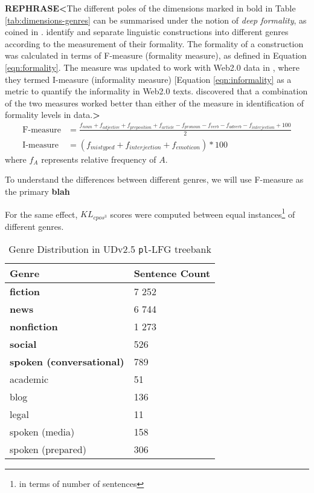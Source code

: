 \textbf{REPHRASE<}The different poles of the dimensions marked in bold in Table \ref{tab:dimensions-genres} can be summarised under the notion of \textit{deep formality}, as coined in \cite{formality1}. \citeauthor{formality1} identify and separate linguistic constructions into different genres according to the measurement of their formality. The formality of a construction was calculated in terms of F-measure (formality measure), as defined in Equation \ref{eqn:formality}. The measure was updated to work with Web2.0 data in \cite{formality2}, where they termed I-measure (informality measure) [Equation \ref{eqn:informality} as a metric to quantify the informality in Web2.0 texts. \citeauthor{formality2} discovered that a combination of the two measures worked better than either of the measure in identification of formality levels in data.\textbf{>}
\begin{align}
    \text{F-measure} &= \textstyle{\frac{f_{noun} + f_{adjective} + f_{preposition} + f_{article} - f_{pronoun} - f_{verb} - f_{adverb} - f_{interjection} + 100}{2}} \label{eqn:formality}\\
    \text{I-measure} &= (f_{mistyped} + f_{interjection} + f_{emoticon}) * 100 \label{eqn:informality}
\end{align}
where \(f_{A}\) represents relative frequency of \(A\).

To understand the differences between different genres, we will use F-measure as the primary 
\textbf{blah}
 


For the same effect, \(KL_{cpos^{3}}\) scores were computed between equal instances\footnote{in terms of number of sentences} of different genres. 

\begin{table}[h]
    \centering
    \begin{tabular}{|l|l|}
        \hline
        \textbf{Genre} & \textbf{Sentence Count} \\
        \hline
        \hline
        \textbf{fiction} & 7 252 \\
        \textbf{news} & 6 744 \\
        \textbf{nonfiction} & 1 273 \\
        \textbf{social} & 526 \\
        \textbf{spoken (conversational)} & 789 \\
        academic & 51 \\
        blog & 136 \\
        legal & 11 \\
        spoken (media) & 158 \\
        spoken (prepared) & 306 \\
        \hline
    \end{tabular}
    \caption{Genre Distribution in UDv2.5 \texttt{pl}-LFG treebank}
    \label{tab:theta2_genre_data}
\end{table}

